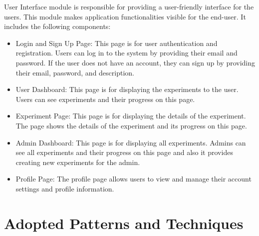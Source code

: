 User Interface module is responsible for providing a user-friendly interface for the users. This module makes application functionalities visible for the end-user. It includes the following components:\\
\begin{itemize}
    \item Login and Sign Up Page: This page is for user authentication and registration. Users can log in to the system by providing their email and password. If the user does not have an account, they can sign up by providing their email, password, and description.
    \item User Dashboard: This page is for displaying the experiments to the user. Users can see experiments and their progress on this page.
    \item Experiment Page: This page is for displaying the details of the experiment. The page shows the details of the experiment and its progress on this page.
    \item Admin Dashboard: This page is for displaying all experiments. Admins can see all experiments and their progress on this page and also it provides creating new experiments for the admin.
    \item Profile Page: The profile page allows users to view and manage their account settings and profile information.
\end{itemize}

\section{Adopted Patterns and Techniques}

